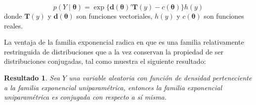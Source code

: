 \documentclass[
  10pt,
  spanish,
]{book}
\newtheorem{proposition}{Resultado}[chapter]
\theoremstyle{definition}
\theoremstyle{definition}
\theoremstyle{definition}
\theoremstyle{definition}
\theoremstyle{remark}
\begin{document}
\begin{equation}
\label{eq:multiexpo}
p(Y \mid \boldsymbol \theta)=\exp\{\mathbf{d}(\boldsymbol \theta)'\mathbf{T}(y)-c(\boldsymbol \theta)\}h(y)
\end{equation} donde \(\mathbf{T}(y)\) y \(\mathbf{d}(\boldsymbol \theta)\) son
funciones vectoriales, \(h(y)\) y \(c(\boldsymbol \theta)\) son funciones reales.

La ventaja de la familia exponencial radica en que es una familia
relativamente restringuida de distribuciones que a la vez conservan la
propiedad de ser distribuciones conjugadas, tal como muestra el
siguiente resultado:

\begin{proposition}
\protect\hypertarget{prp:FE1}{}{\label{prp:FE1} }Sea \(Y\) una variable aleatoria con función de densidad perteneciente a la familia exponencial uniparamétrica, entonces la familia exponencial uniparamétrica es conjugada con respecto a sí misma.
\end{proposition}
\end{document}
